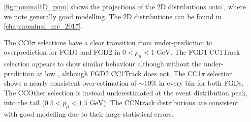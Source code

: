 \autoref{fig:nominal1D_pmu} shows the projections of the 2D distributions onto \pmu, where we note generally good modelling. The 2D distributions can be found in \autoref{chap:nominal_mc_2017}.

The CC0$\pi$ selections have a clear transition from under-prediction to overprediction for FGD1 and FGD2 in $0 < p_\mu < 1 \text{ GeV}$. The FGD1 \numubar CC1Track selection appears to show similar behaviour although without the under-prediction at low \pmu, although FGD2 \numu CC1Track does not. The CC1$\pi$ selection shows a nearly consistent over-estimation of $\sim10\%$ in every bin for both FGDs. The CCOther selection is instead underestimated at the event distribution peak, into the tail ($0.5<p_\mu <1.5\text{ GeV}$). The CCNtrack distributions are consistent with good modelling due to their large statistical errors.
